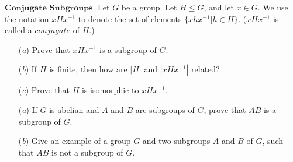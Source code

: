 \documentclass[12pt,letterpaper,boxed]{hmcpset}
\begin{document}

\begin{problem}[2.6.27]
$\textbf{Conjugate Subgroups.}$ Let $G$ be a group. Let $H \leq G$, and let $x \in G$. We use the notation $xHx^{-1}$ to denote the set of elements $\{ xhx^{-1} \vert h \in H \}$. ($xHx^{-1}$ is called a $\textit{conjugate}$ of $H$.)
\begin{itemize}
  \item[(\textit{a})] Prove that $xHx^{-1}$ is a subgroup of $G$.
  
  \item[(\textit{b})] If $H$ is finite, then how are $|H|$ and $|xHx^{-1}|$ related?
  
  \item[(\textit{c})] Prove that $H$ is isomorphic to $xHx^{-1}$.
\end{itemize}
\end{problem}

\begin{solution}

\end{solution}

\clearpage

\begin{problem}[2.6.32]
\begin{itemize}
  \item[(\textit{a})] If $G$ is abelian and $A$ and $B$ are subgroups of $G$, prove that $AB$ is a subgroup of $G$.
  
  \item[(\textit{b})] Give an example of a group $G$ and two subgroups $A$ and $B$ of $G$, such that $AB$ is not a subgroup of $G$.
\end{itemize}
\end{problem}

\begin{solution}
\end{solution}

\clearpage
\end{document}

